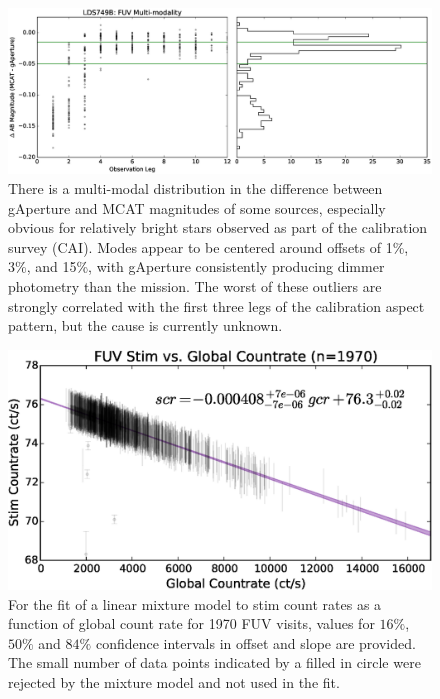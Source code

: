 \documentclass[preprint]{aastex}
\begin{document}
\begin{figure}
\includegraphics[scale=0.55]{Fig15.eps}
\caption{There is a multi-modal distribution in the difference between gAperture and MCAT magnitudes of some sources, especially obvious for relatively bright stars observed as part of the calibration survey (CAI). Modes appear to be centered around offsets of 1\%, 3\%, and 15\%, with gAperture consistently producing dimmer photometry than the mission. The worst of these outliers are strongly correlated with the first three legs of the calibration aspect pattern, but the cause is currently unknown.
\label{ldslegs}}
\end{figure}


\begin{figure}
\includegraphics[scale=0.95]{Fig16.eps}
\caption{For the fit of a linear mixture model to stim count rates as a function of global count rate for 1970 FUV visits, values for $16\%$, $50\%$ and $84\%$ confidence intervals in offset and slope are provided. The small number of data points indicated by a filled in circle were rejected by the mixture model and not used in the fit.
\label{fuvstim}}
\end{figure}
\end{document}
